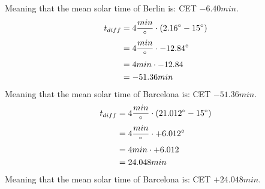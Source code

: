 Meaning that the mean solar time of Berlin is: CET $-6.40 min$.
\begin{equation*}
    \begin{split}
        t_{diff} &= 4 \frac{min}{\degree} \cdot (2.16 \degree - 15 \degree)\\
        &= 4 \frac{min}{\degree} \cdot - 12.84 \degree\\
        &= 4 min \cdot - 12.84\\
        &= -51.36 min 
    \end{split}
\end{equation*}
Meaning that the mean solar time of Barcelona is: CET $-51.36 min$.
\begin{equation*}
    \begin{split}
        t_{diff} &= 4 \frac{min}{\degree} \cdot (21.012 \degree - 15 \degree)\\
        &= 4 \frac{min}{\degree} \cdot + 6.012 \degree\\
        &= 4 min \cdot + 6.012\\
        &= 24.048 min 
    \end{split}
\end{equation*}
Meaning that the mean solar time of Barcelona is: CET $+24.048 min$.
